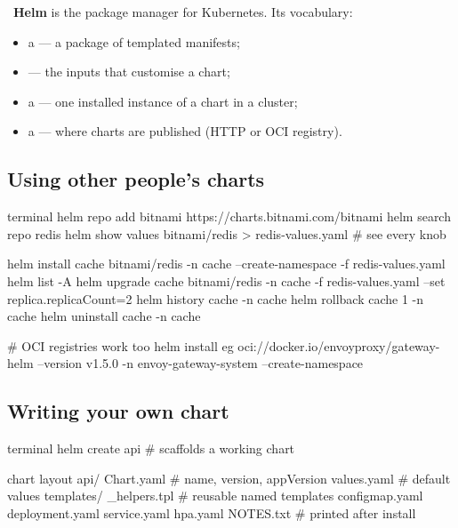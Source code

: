 ~\textbf{Helm} is the package manager for Kubernetes. Its
vocabulary:

\begin{itemize}
  \item a  --- a package of templated manifests;
  \item {} --- the inputs that customise a chart;
  \item a  --- one installed instance of a chart in a cluster;
  \item a  --- where charts are published (HTTP or OCI registry).
\end{itemize}

\subsection{Using other people's charts}

\begin{bashcode}{terminal}
helm repo add bitnami https://charts.bitnami.com/bitnami
helm search repo redis
helm show values bitnami/redis > redis-values.yaml     # see every knob

helm install cache bitnami/redis -n cache --create-namespace -f redis-values.yaml
helm list -A
helm upgrade cache bitnami/redis -n cache -f redis-values.yaml --set replica.replicaCount=2
helm history cache -n cache
helm rollback cache 1 -n cache
helm uninstall cache -n cache

# OCI registries work too
helm install eg oci://docker.io/envoyproxy/gateway-helm --version v1.5.0 -n envoy-gateway-system --create-namespace
\end{bashcode}

\subsection{Writing your own chart}

\begin{bashcode}{terminal}
helm create api      # scaffolds a working chart
\end{bashcode}

\begin{plaincode}{chart layout}
api/
  Chart.yaml            # name, version, appVersion
  values.yaml           # default values
  templates/
    _helpers.tpl        # reusable named templates
    configmap.yaml
    deployment.yaml
    service.yaml
    hpa.yaml
    NOTES.txt           # printed after install
\end{plaincode}


